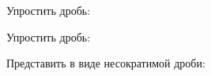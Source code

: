 \begin{listofex}
	\item Упростить дробь:
	\begin{enumcols}[itemcolumns=2]
		\item {}
		\item {}
		\item {}
		\item {}
		\item {}
		\item {}
	\end{enumcols}
	\item {}
	\item Упростить дробь:
	\begin{enumcols}[itemcolumns=2]
		\item {}
		\item {}
		\item {}
		\item {}
		\item {}
		\item {}
	\end{enumcols}
	\item Представить в виде несократимой дроби:
	\begin{enumcols}[itemcolumns=2]
		\item {}
		\item {}
		\item {}
	\end{enumcols}
\end{listofex}
\newpage

